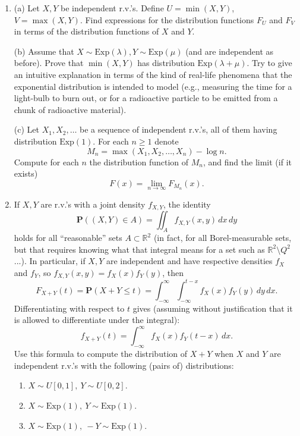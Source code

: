 \documentclass[12pt]{article}
\newcommand{\R}{\mathbb{R}}
\newcommand{\prob}{\mathbf{P}}
\theoremstyle{example}
\begin{document}
\begin{enumerate}
\medskip\noindent
(b) Show that $Y$ and $Z$ are independent. (\textbf{Hint:} check that $\prob(Y=n, Z\le t)=\prob(Y=n)\prob(Z\le t)$ for all $n$ and $t$.)

\item (a) Let $X, Y$ be independent r.v.'s. Define $U=\min(X,Y)$, $V=\max(X,Y)$. Find expressions for the distribution functions $F_U$ and $F_V$ in terms of the distribution functions of $X$ and $Y$.

\medskip \noindent
(b) Assume that $X \sim \textrm{Exp}(\lambda), Y \sim \textrm{Exp}(\mu)$ (and are independent as before). Prove that 
$\min(X,Y)$ has distribution $\textrm{Exp}(\lambda+\mu)$. Try to give an intuitive explanation in terms of the kind of real-life phenomena that the exponential distribution is intended to model (e.g., measuring the time for a light-bulb to burn out, or for a radioactive particle to be emitted from a chunk of radioactive material). 

\medskip \noindent
(c) Let $X_1, X_2, \ldots$ be a sequence of independent r.v.'s, all of them having distribution $\textrm{Exp}(1)$. For each $n\ge1$ denote
$$ M_n = \max(X_1,X_2,\ldots,X_n) - \log n. $$
Compute for each $n$ the distribution function of $M_n$, and find the limit (if it exists)
$$ F(x) = \lim_{n\to\infty} F_{M_n}(x). $$

\item If $X,Y$ are r.v.'s with a joint density $f_{X,Y}$, the identity
$$ \prob((X,Y) \in A) = \iint_A f_{X,Y}(x,y)\,dx\,dy $$
holds for all ``reasonable'' sets $A\subset \R^2$ (in fact, for all Borel-measurable sets, but that requires knowing what that integral means for a set such as $\R^2\setminus Q^2$...). In particular, if $X,Y$ are independent and have respective densities $f_X$ and $f_Y$, so $f_{X,Y}(x,y)=f_X(x)f_Y(y)$, then
$$ F_{X+Y}(t) = \prob(X+Y \le t) = \int_{-\infty}^\infty \int_{-\infty}^{t-x} f_{X}(x)f_Y(y)\,dy\,dx. $$
Differentiating with respect to $t$ gives (assuming without justification that it is allowed to differentiate under the integral):
$$ f_{X+Y}(t) = \int_{-\infty}^\infty f_X(x)f_Y(t-x)\,dx. $$
Use this formula to compute the distribution of $X+Y$ when $X$ and $Y$ are independent r.v.'s with the following (pairs of) distributions:
\begin{enumerate}
\item $X \sim U[0,1],\ Y \sim U[0,2]$.
\item $X \sim \textrm{Exp}(1),\ Y \sim \textrm{Exp}(1)$.
\item $X \sim \textrm{Exp}(1),\  -Y \sim \textrm{Exp}(1)$.
\end{enumerate}


\end{enumerate}
\end{document}
